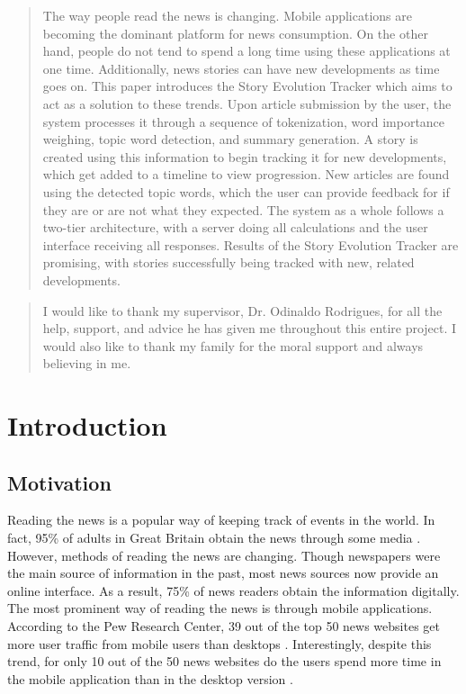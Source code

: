 \documentclass[11pt,titlepage]{report}
\begin{document}
\begin{abstract}
The way people read the news is changing. Mobile applications are becoming the dominant platform for news consumption. On the other hand, people do not tend to spend a long time using these applications at one time. Additionally, news stories can have new developments as time goes on. This paper introduces the Story Evolution Tracker which aims to act as a solution to these trends. Upon article submission by the user, the system processes it through a sequence of tokenization, word importance weighing, topic word detection, and summary generation. A story is created using this information to begin tracking it for new developments, which get added to a timeline to view progression. New articles are found using the detected topic words, which the user can provide feedback for if they are or are not what they expected. The system as a whole follows a two-tier architecture, with a server doing all calculations and the user interface receiving all responses. Results of the Story Evolution Tracker are promising, with stories successfully being tracked with new, related developments. 
\end{abstract}

\renewcommand{\abstractname}{Acknowledgements}
\begin{abstract}
I would like to thank my supervisor, Dr. Odinaldo Rodrigues, for all the help, support, and advice he has given me throughout this entire project. I would also like to thank my family for the moral support and always believing in me. 
\end{abstract}

\tableofcontents
\listoffigures

\chapter{Introduction}
\section{Motivation}\label{se:motivation}
Reading the news is a popular way of keeping track of events in the world. In fact, 95\% of adults in Great Britain obtain the news through some media \cite{news_facts}. However, methods of reading the news are changing. Though newspapers were the main source of information in the past, most news sources now provide an online interface. As a result, 75\% of news readers obtain the information digitally. The most prominent way of reading the news is through mobile applications.  According to the Pew Research Center, 39 out of the top 50 news websites get more user traffic from mobile users than desktops \cite{digital_trends}. Interestingly, despite this trend, for only 10 out of the 50 news websites do the users spend more time in the mobile application than in the desktop version \cite{digital_trends}. 
\end{document}
